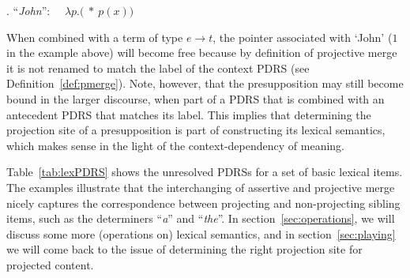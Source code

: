 \ex. ``\textit{John}'':~~ 
  $\lambda p.($$~*~p(x))$

When combined with a term of type $e\rightarrow t$, the pointer associated
with `John' ($1$ in the example above) will become free because by
definition of projective merge it is not renamed to match the label of the
context PDRS (see Definition~\ref{def:pmerge}). Note, however, that the
presupposition may still become bound in the larger discourse, when part of
a PDRS that is combined with an antecedent PDRS that matches its label. This
implies that determining the projection site of a presupposition is part of
constructing its lexical semantics, which makes sense in the light of the
context-dependency of meaning. 

Table~\ref{tab:lexPDRS} shows the unresolved PDRSs for a set of basic
lexical items. The examples illustrate that the interchanging of assertive
and projective merge nicely captures the correspondence between projecting
and non-projecting sibling items, such as the determiners ``\textit{a}'' and
``\textit{the}''. In section~\ref{sec:operations}, we will discuss some more
(operations on) lexical semantics, and in section~\ref{sec:playing} we will
come back to the issue of determining the right projection site for
projected content. %


